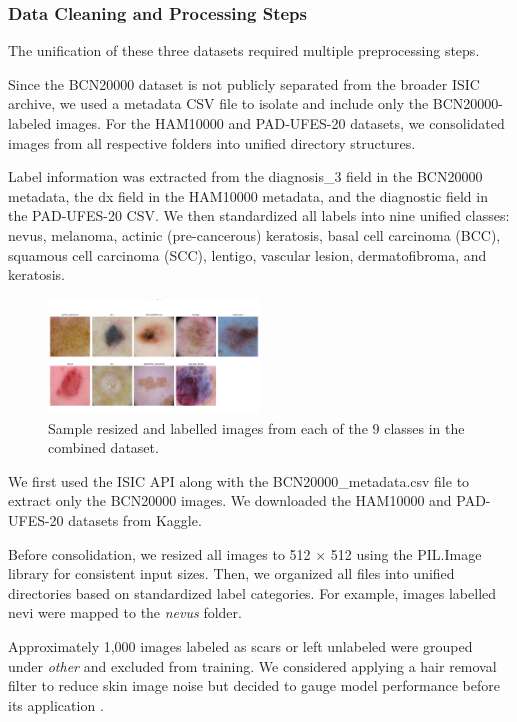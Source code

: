 \documentclass{article} %
\begin{document}
\subsubsection{Data Cleaning and Processing Steps}

The unification of these three datasets required multiple preprocessing steps.

Since the BCN20000 dataset is not publicly separated from the broader ISIC archive, we used a metadata CSV file to isolate and include only the BCN20000-labeled images. For the HAM10000 and PAD-UFES-20 datasets, we consolidated images from all respective folders into unified directory structures.

Label information was extracted from the diagnosis\_3 field in the BCN20000 metadata, the dx field in the HAM10000 metadata, and the diagnostic field in the PAD-UFES-20 CSV. We then standardized all labels into nine unified classes: nevus, melanoma, actinic (pre-cancerous) keratosis, basal cell carcinoma (BCC), squamous cell carcinoma (SCC), lentigo, vascular lesion, dermatofibroma, and keratosis.

\begin{figure}[h]
\begin{center}
\includegraphics[width=0.5\textwidth]{Figs/sample_class_images.png}
\end{center}
\caption{Sample resized and labelled images from each of the 9 classes in the combined dataset.}
\end{figure}

We first used the ISIC API along with the BCN20000\_metadata.csv file to extract only the BCN20000 images. We downloaded the HAM10000 and PAD-UFES-20 datasets from Kaggle.

Before consolidation, we resized all images to 512 × 512 using the PIL.Image library for consistent input sizes. Then, we organized all files into unified directories based on standardized label categories. For example, images labelled nevi were mapped to the \textit{nevus} folder.

Approximately 1,000 images labeled as scars or left unlabeled were grouped under \textit{other} and excluded from training. We considered applying a hair removal filter to reduce skin image noise but decided to gauge model performance before its application \citep{kalpana2025enhancing}.
\end{document}
